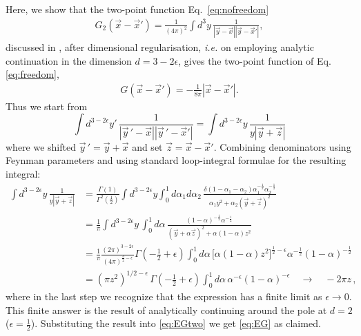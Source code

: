 \documentclass[aps,preprintnumbers,superscriptaddress,longbibliography]{revtex4-1}
\begin{document}
Here, we show that the two-point function Eq.~\eqref{eq:nofreedom} 
\begin{align}
\label{eq:EGtwo}
    G_2(\vec{x}-\vec{x}')=\frac{1}{(4\pi)^2}\int\! d^3y \,\frac{1}{|\vec{y}-\vec{x}||\vec{y}-\vec{x}'|},
\end{align}
discussed in \cite{oppenheim2022gravitationally}, after dimensional regularisation, \textit{i.e.} on employing analytic continuation in the dimension $d=3-2\epsilon$, gives the two-point function of Eq. \eqref{eq:freedom},
\begin{align}
\label{eq:EG}
    G(\vec{x}-\vec{x}')=-\frac{1}{8 \pi}|\vec{x}-\vec{x}'|.
\end{align}
Thus we start from 
\begin{equation}
    \int\! d^{3-2\epsilon}y'\, \frac{1}{|\vec{y}\,'-\vec{x}||\vec{y}\,'-\vec{x}'|} = \int\! d^{3-2\epsilon}y\, \frac{1}{y|\vec{y}+\vec{z}|}
\end{equation}
where we shifted $\vec{y}{\,'}=\vec{y}+\vec{x}$ and set $\vec{z}=\vec{x}-\vec{x}'$. Combining denominators using Feynman parameters and using standard loop-integral formulae for the resulting integral:
\begin{equation}
\begin{split}
\int\! d^{3-2\epsilon}y\, \frac{1}{y|\vec{y}+\vec{z}|} &= \frac{\Gamma(1)}{\Gamma^2(\tfrac12)} \int d^{3-2\epsilon}y\int_0^1\!\! d\alpha_1 d\alpha_2\, \frac{\delta(1-\alpha_1-\alpha_2)\alpha_1^{-\frac{1}{2}}\alpha_2^{-\frac{1}{2}} }{\alpha_1y^2+\alpha_2(\vec{y}+\vec{z})^2} \\
&=\frac{1}{\pi}\int\! d^{3-2\epsilon}y\, \int_0^1\!\! d\alpha \,\frac{(1-\alpha)^{-\frac{1}{2}}\alpha^{-\frac{1}{2}}}{(\vec{y}+\alpha \vec{z})^2 + \alpha(1-\alpha)z^2} \\
&=\frac{1}{\pi} \frac{(2\pi)^{3-2\epsilon}}{(4\pi)^{\frac{3}{2}-\epsilon}}\Gamma\left(-\tfrac12+\epsilon\right)\int_0^1\!\! d\alpha \,\big[\alpha(1-\alpha)z^2\big]^{\frac{1}{2}-\epsilon}\alpha^{-\frac{1}{2}}(1-\alpha)^{-\frac{1}{2}}\\
&=(\pi z^2)^{1/2-\epsilon}\,\Gamma(-\tfrac12+\epsilon)  \int_0^1\!\! d\alpha\, \alpha^{-\epsilon}(1-\alpha)^{-\epsilon}\quad \to\quad -2\pi z\,,
\end{split}
\end{equation}
where in the last step we recognize that the expression has a finite limit as $\epsilon\to0$. This finite answer is the result of analytically continuing around the pole at $d=2$ ($\epsilon=\tfrac12$). Substituting the result into \eqref{eq:EGtwo} we get \eqref{eq:EG} as claimed.
\end{document}
